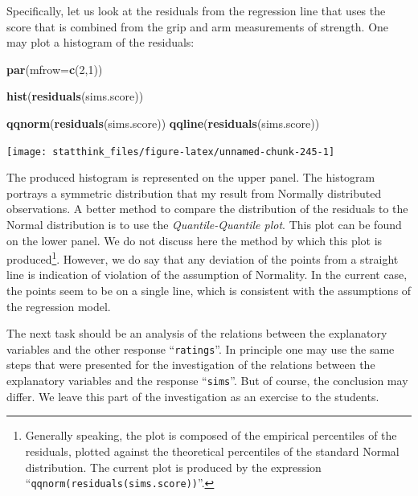 \documentclass[]{krantz}
\makeatletter
\newenvironment{Shaded}{\begin{snugshade}}{\end{snugshade}}
\newcommand{\KeywordTok}[1]{\textcolor[rgb]{0.13,0.29,0.53}{\textbf{#1}}}
\newcommand{\DataTypeTok}[1]{\textcolor[rgb]{0.13,0.29,0.53}{#1}}
\newcommand{\DecValTok}[1]{\textcolor[rgb]{0.00,0.00,0.81}{#1}}
\newcommand{\NormalTok}[1]{#1}
\newenvironment{kframe}{%
\medskip{}
\setlength{\fboxsep}{.8em}
 \def\at@end@of@kframe{}%
 \ifinner\ifhmode%
  \def\at@end@of@kframe{\end{minipage}}%
  \begin{minipage}{\columnwidth}%
 \fi\fi%
 \def\FrameCommand##1{\hskip\@totalleftmargin \hskip-\fboxsep
 \colorbox{shadecolor}{##1}\hskip-\fboxsep
     \hskip-\linewidth \hskip-\@totalleftmargin \hskip\columnwidth}%
 \MakeFramed {\advance\hsize-\width
   \@totalleftmargin\z@ \linewidth\hsize
   \@setminipage}}%
 {\par\unskip\endMakeFramed%
 \at@end@of@kframe}
\renewenvironment{Shaded}{\begin{kframe}}{\end{kframe}}
\theoremstyle{definition}
\theoremstyle{definition}
\theoremstyle{definition}
\theoremstyle{remark}
\makeatother
\begin{document}
Specifically, let us look at the residuals from the regression line that
uses the score that is combined from the grip and arm measurements of
strength. One may plot a histogram of the residuals:

\begin{Shaded}
\begin{Highlighting}[]
\KeywordTok{par}\NormalTok{(}\DataTypeTok{mfrow=}\KeywordTok{c}\NormalTok{(}\DecValTok{2}\NormalTok{,}\DecValTok{1}\NormalTok{))}

\KeywordTok{hist}\NormalTok{(}\KeywordTok{residuals}\NormalTok{(sims.score))}

\KeywordTok{qqnorm}\NormalTok{(}\KeywordTok{residuals}\NormalTok{(sims.score))}
\KeywordTok{qqline}\NormalTok{(}\KeywordTok{residuals}\NormalTok{(sims.score))}
\end{Highlighting}
\end{Shaded}

\begin{center}\texttt{[image: statthink\_files/figure-latex/unnamed-chunk-245-1]} \end{center}

The produced histogram is represented on the upper panel. The histogram
portrays a symmetric distribution that my result from Normally
distributed observations. A better method to compare the distribution of
the residuals to the Normal distribution is to use the
\emph{Quantile-Quantile plot}. This plot can be found on the lower
panel. We do not discuss here the method by which this plot is
produced\footnote{Generally speaking, the plot is composed of the
  empirical percentiles of the residuals, plotted against the
  theoretical percentiles of the standard Normal distribution. The
  current plot is produced by the expression
  ``\texttt{qqnorm(residuals(sims.score))}''.}. However, we do say that
any deviation of the points from a straight line is indication of
violation of the assumption of Normality. In the current case, the
points seem to be on a single line, which is consistent with the
assumptions of the regression model.

The next task should be an analysis of the relations between the
explanatory variables and the other response ``\texttt{ratings}''. In
principle one may use the same steps that were presented for the
investigation of the relations between the explanatory variables and the
response ``\texttt{sims}''. But of course, the conclusion may differ. We
leave this part of the investigation as an exercise to the students.
\end{document}
